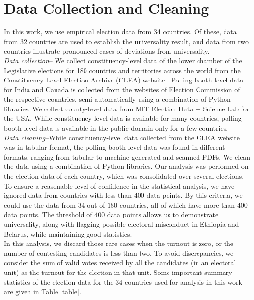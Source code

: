 \documentclass[reprint,aps,prl,showpacs,twocolumn, superscriptaddress]{revtex4-2}
\begin{document}
\section{Data Collection and Cleaning}
In this work, we use empirical election data from 34 countries. Of these, data from 32 countries are used to establish the universality result, and data from two countries illustrate pronounced cases of deviations from universality.\\
 
\emph{Data collection}-- We collect constituency-level data of the lower chamber of the Legislative elections for 180 countries and territories across the world from the Constituency-Level Election Archive (CLEA) website \cite{clea}. Polling booth level data for India and Canada is collected from the websites of Election Commission \cite{india_data, canada_data} of the respective countries, semi-automatically using a combination of Python libraries. We collect county-level data from MIT Election Data + Science Lab \cite{DVN/VOQCHQ_2018} for the USA. While constituency-level data is available for many countries, polling booth-level data is available in the public domain only for a few countries.\\

\emph{Data cleaning}--While constituency-level data collected from the CLEA website was in tabular format, the polling booth-level data was found in different formats, ranging from tabular to machine-generated and scanned PDFs. We clean the data using a combination of Python libraries. Our analysis was performed on the election data of each country, which was consolidated over several elections. To ensure a reasonable level of confidence in the statistical analysis, we have ignored data from countries with less than 400 data points. By this criteria, we could use the data from $34$ out of $180$ countries, all of which have more than $400$ data points. The threshold of $400$ data points allows us to demonstrate universality, along with flagging possible electoral misconduct in Ethiopia and Belarus, while maintaining good statistics.\\ 

In this analysis, we discard those rare cases when the turnout is zero, or the number of contesting candidates is less than two. To avoid discrepancies, we consider the sum of valid votes received by all the candidates (in an electoral unit) as the turnout for the election in that unit. Some important summary statistics of the election data for the $34$ countries used for analysis in this work are given in Table \ref{table}.
\newpage
\end{document}
